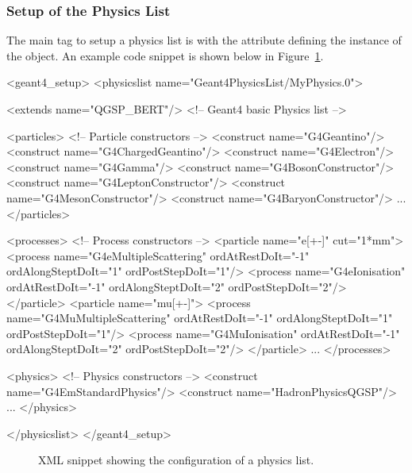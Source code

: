 \subsubsection{Setup of the Physics List}
\label{sec:ddg4-setup-xml-physicslist}

\noindent
The main tag to setup a physics list is  with the 
 attribute defining the instance of the  object.
An example code snippet is shown below in Figure~\ref{fig:ddg4-setup-xml-physicslist}.

\begin{code}
<geant4_setup>
  <physicslist name="Geant4PhysicsList/MyPhysics.0">

    <extends name="QGSP_BERT"/>                    <!-- Geant4 basic Physics list -->

    <particles>                                    <!-- Particle constructors     -->
      <construct name="G4Geantino"/>
      <construct name="G4ChargedGeantino"/>
      <construct name="G4Electron"/>
      <construct name="G4Gamma"/>
      <construct name="G4BosonConstructor"/>
      <construct name="G4LeptonConstructor"/>
      <construct name="G4MesonConstructor"/>
      <construct name="G4BaryonConstructor"/>
      ...
    </particles>

    <processes>                                    <!-- Process constructors      -->
      <particle name="e[+-]" cut="1*mm">
        <process name="G4eMultipleScattering"  ordAtRestDoIt="-1"       ordAlongSteptDoIt="1"
                                               ordPostStepDoIt="1"/>
        <process name="G4eIonisation"          ordAtRestDoIt="-1"       ordAlongSteptDoIt="2"
                                               ordPostStepDoIt="2"/>
      </particle>
      <particle name="mu[+-]">
        <process name="G4MuMultipleScattering" ordAtRestDoIt="-1"       ordAlongSteptDoIt="1"     
                                               ordPostStepDoIt="1"/>
        <process name="G4MuIonisation"         ordAtRestDoIt="-1"       ordAlongSteptDoIt="2"
                                               ordPostStepDoIt="2"/>
      </particle>
      ...
    </processes>

    <physics>                                      <!-- Physics constructors      -->
      <construct name="G4EmStandardPhysics"/>
      <construct name="HadronPhysicsQGSP"/>
      ...
    </physics>
    
  </physicslist>
</geant4_setup>
\end{code}
\begin{figure}[h]
\caption{XML snippet showing the configuration of a physics list.}
\label{fig:ddg4-setup-xml-physicslist}
\end{figure}


